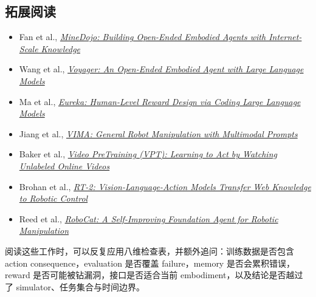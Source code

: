 \documentclass[a4paper]{article}
\begin{document}
\subsection{拓展阅读}

\begingroup
\footnotesize
\begin{itemize}[itemsep=0pt,topsep=0.15em,parsep=0pt]
  \item Fan et al., \href{https://arxiv.org/abs/2206.08853}{\emph{MineDojo: Building Open-Ended Embodied Agents with Internet-Scale Knowledge}}
  \item Wang et al., \href{https://arxiv.org/abs/2305.16291}{\emph{Voyager: An Open-Ended Embodied Agent with Large Language Models}}
  \item Ma et al., \href{https://arxiv.org/abs/2310.12931}{\emph{Eureka: Human-Level Reward Design via Coding Large Language Models}}
  \item Jiang et al., \href{https://arxiv.org/abs/2210.03094}{\emph{VIMA: General Robot Manipulation with Multimodal Prompts}}
  \item Baker et al., \href{https://arxiv.org/abs/2206.11795}{\emph{Video PreTraining (VPT): Learning to Act by Watching Unlabeled Online Videos}}
  \item Brohan et al., \href{https://arxiv.org/abs/2307.15818}{\emph{RT-2: Vision-Language-Action Models Transfer Web Knowledge to Robotic Control}}
  \item Reed et al., \href{https://arxiv.org/abs/2306.11706}{\emph{RoboCat: A Self-Improving Foundation Agent for Robotic Manipulation}}
\end{itemize}

阅读这些工作时，可以反复应用八维检查表，并额外追问：训练数据是否包含 action consequence，evaluation 是否覆盖 failure，memory 是否会累积错误，reward 是否可能被钻漏洞，接口是否适合当前 embodiment，以及结论是否越过了 simulator、任务集合与时间边界。
\endgroup
\end{document}
